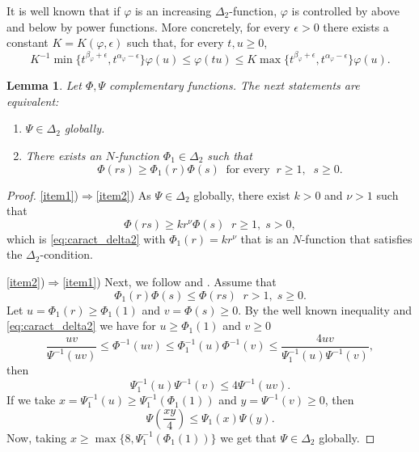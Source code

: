 \documentclass[twoside]{article}
\newtheorem{lem}[thm]{Lemma}
\theoremstyle{remark}
\renewcommand{\leq}{\leqslant}
\renewcommand{\geq}{\geqslant}
\begin{document}
 It is well known   that if $\varphi$ is an increasing $\Delta_2$-function, $\varphi$ is controlled by above and below 
 by power functions.  More concretely, for every $\epsilon>0$ there exists a
constant $K=K(\varphi,\epsilon)$ such that, for every $t,u\geq 0$,
\begin{equation}\label{delta2-potencias}
    K^{-1}\min\big\{t^{\beta_{\varphi}+\epsilon},t^{\alpha_{\varphi}-\epsilon} \big\}\varphi(u)\leq \varphi(t u)\leq
    K\max\big\{t^{\beta_{\varphi}+\epsilon},t^{\alpha_{\varphi}-\epsilon} \big\}\varphi(u).
\end{equation}



\begin{lem}
Let $\Phi,\Psi$ complementary functions.
The next statements are equivalent:
\begin{enumerate}
\item\label{item1} $\Psi \in \Delta_2$ globally.
\item\label{item2} There exists an $N$-function $\Phi_1 \in \Delta_2$ such that
\begin{equation}\label{eq:caract_delta2}
\Phi(rs)\geq \Phi_1(r)\Phi(s)\;\;\mbox{for every}\;\;r\geq1,\;\;s\geq 0.
\end{equation}
\end{enumerate}
\end{lem}

\begin{proof}
\ref{item1})$\Rightarrow$\ref{item2}) As $\Psi \in  \Delta_2$ globally, there exist $k>0$ and $\nu>1$ such that
\[
\Phi(rs)\geq k r^\nu \Phi(s)\;\;r\geq 1,\;s>0,
\]
which is \eqref{eq:caract_delta2} with $\Phi_1(r)=kr^\nu$ that is an $N$-function that satisfies the $\Delta_2$-condition.

\ref{item2})$\Rightarrow$\ref{item1})
Next, we follow  \cite[p. 32, Prop. 13]{rao1991theory} and \cite[p. 29, Prop. 9]{rao1991theory}.
Assume that 
\[
\Phi_1(r)\Phi(s)\leq \Phi(rs)\;\;r>1,\;s\geq 0.
\]
Let $u=\Phi_1(r)\geq \Phi_1(1)$ and $v=\Phi(s)\geq 0$. By the well known inequality \cite[p. 13, Prop. 1]{rao1991theory} and \eqref{eq:caract_delta2} we have  for $u\geq \Phi_1(1)$ and $v\geq 0$
\[
\frac{uv}{\Psi^{-1}(uv)}\leq \Phi^{-1}(uv)\leq\Phi_1^{-1}(u)\Phi^{-1}(v)\leq
\frac{4uv}{\Psi_1^{-1}(u)\Psi^{-1}(v)},
\]
then 
\[
\Psi^{-1}_1(u)\Psi^{-1}(v)\leq 4 \Psi^{-1}(uv).
\]
If we take $x=\Psi^{-1}_1(u)\geq \Psi^{-1}_1(\Phi_1(1))$ and $y=\Psi^{-1}(v)\geq 0$, then 
\[
\Psi\left(\frac{xy}{4}\right)\leq \Psi_1(x)\Psi(y).
\]
Now, taking  $x\geq \max\{8,\Psi_1^{-1}(\Phi_1(1))\}$ we get that $\Psi \in \Delta_2$ globally.
\end{proof}
\end{document}

